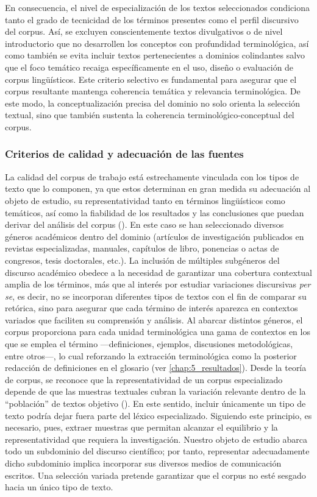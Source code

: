 En consecuencia, el nivel de especialización de los textos seleccionados condiciona tanto el grado de tecnicidad de los términos presentes como el perfil discursivo del corpus. Así, se excluyen conscientemente textos divulgativos o de nivel introductorio que no desarrollen los conceptos con profundidad terminológica, así como también se evita incluir textos pertenecientes a dominios colindantes salvo que el foco temático recaiga específicamente en el uso, diseño o evaluación de corpus lingüísticos. Este criterio selectivo es fundamental para asegurar que el corpus resultante mantenga coherencia temática y relevancia terminológica. De este modo, la conceptualización precisa del dominio no solo orienta la selección textual, sino que también sustenta la coherencia terminológico-conceptual del corpus.

\subsubsection{Criterios de calidad y adecuación de las fuentes}\label{subsec:calidad}

La calidad del corpus de trabajo está estrechamente vinculada con los tipos de texto que lo componen, ya que estos determinan en gran medida su adecuación al objeto de estudio, su representatividad tanto en términos lingüísticos como temáticos, así como la fiabilidad de los resultados y las conclusiones que puedan derivar del análisis del corpus (\cite{perez2002explotacion}). En este caso se han seleccionado diversos géneros académicos dentro del dominio (artículos de investigación publicados en revistas especializadas, manuales, capítulos de libro, ponencias o actas de congresos, tesis doctorales, etc.). La inclusión de múltiples subgéneros del discurso académico obedece a la necesidad de garantizar una cobertura contextual amplia de los términos, más que al interés por estudiar variaciones discursivas \textit{per se}, es decir, no se incorporan diferentes tipos de textos con el fin de comparar su retórica, sino para asegurar que cada término de interés aparezca en contextos variados que faciliten su comprensión y análisis. Al abarcar distintos géneros, el corpus proporciona para cada unidad terminológica una gama de contextos en los que se emplea el término —definiciones, ejemplos, discusiones metodológicas, entre otros—, lo cual reforzando la extracción terminológica como la posterior redacción de definiciones en el glosario (ver \ref{chap:5_resultados}). Desde la teoría de corpus, se reconoce que la representatividad de un corpus especializado depende de que las muestras textuales cubran la variación relevante dentro de la “población” de textos objetivo (\cite{McEnery2006}). En este sentido, incluir únicamente un tipo de texto podría dejar fuera parte del léxico especializado. Siguiendo este principio, es necesario, pues, extraer muestras que permitan alcanzar el equilibrio y la representatividad que requiera la investigación. Nuestro objeto de estudio abarca todo un subdominio del discurso científico; por tanto, representar adecuadamente dicho subdominio implica incorporar sus diversos medios de comunicación escritos. Una selección variada pretende garantizar que el corpus no esté sesgado hacia un único tipo de texto.

